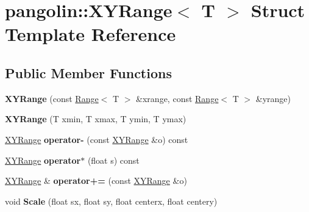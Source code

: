 \hypertarget{structpangolin_1_1_x_y_range}{}\section{pangolin\+:\+:X\+Y\+Range$<$ T $>$ Struct Template Reference}
\label{structpangolin_1_1_x_y_range}
\subsection*{Public Member Functions}
\begin{DoxyCompactItemize}
\item 
{\bfseries X\+Y\+Range} (const \hyperlink{structpangolin_1_1_range}{Range}$<$ T $>$ \&xrange, const \hyperlink{structpangolin_1_1_range}{Range}$<$ T $>$ \&yrange)\hypertarget{structpangolin_1_1_x_y_range_a46d7c42eeb43080023001ef89c5014d8}{}\label{structpangolin_1_1_x_y_range_a46d7c42eeb43080023001ef89c5014d8}

\item 
{\bfseries X\+Y\+Range} (T xmin, T xmax, T ymin, T ymax)\hypertarget{structpangolin_1_1_x_y_range_af6e44627317cacef22dcb0a132f0934a}{}\label{structpangolin_1_1_x_y_range_af6e44627317cacef22dcb0a132f0934a}

\item 
\hyperlink{structpangolin_1_1_x_y_range}{X\+Y\+Range} {\bfseries operator-\/} (const \hyperlink{structpangolin_1_1_x_y_range}{X\+Y\+Range} \&o) const \hypertarget{structpangolin_1_1_x_y_range_acc42638ca8ad0f72e4d8d13f734bc553}{}\label{structpangolin_1_1_x_y_range_acc42638ca8ad0f72e4d8d13f734bc553}

\item 
\hyperlink{structpangolin_1_1_x_y_range}{X\+Y\+Range} {\bfseries operator$\ast$} (float s) const \hypertarget{structpangolin_1_1_x_y_range_a19707f4bc381a2d9fbbae6ac561f319a}{}\label{structpangolin_1_1_x_y_range_a19707f4bc381a2d9fbbae6ac561f319a}

\item 
\hyperlink{structpangolin_1_1_x_y_range}{X\+Y\+Range} \& {\bfseries operator+=} (const \hyperlink{structpangolin_1_1_x_y_range}{X\+Y\+Range} \&o)\hypertarget{structpangolin_1_1_x_y_range_a0d4c5c483736006f14a097013a410f28}{}\label{structpangolin_1_1_x_y_range_a0d4c5c483736006f14a097013a410f28}

\item 
void {\bfseries Scale} (float sx, float sy, float centerx, float centery)\hypertarget{structpangolin_1_1_x_y_range_a3be70ef4edd8bddf639db7bc644a7fa1}{}\label{structpangolin_1_1_x_y_range_a3be70ef4edd8bddf639db7bc644a7fa1}


\end{DoxyCompactItemize}
